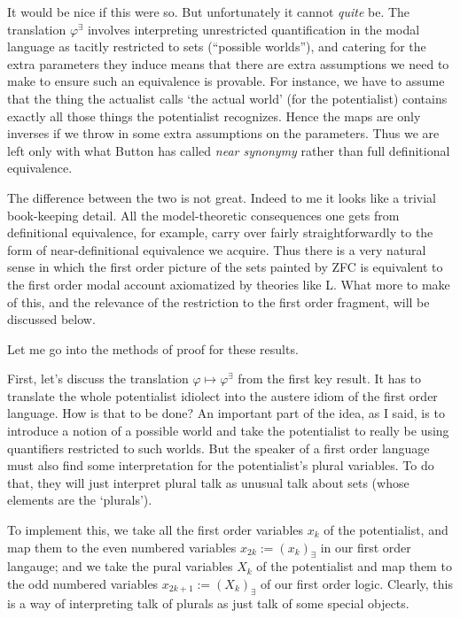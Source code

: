 \documentclass{article}
\begin{document}
It would be nice if this were so. But unfortunately it cannot \emph{quite} be. 
The translation $\varphi^\exists$ 
involves interpreting unrestricted quantification in the modal language as 
tacitly restricted 
to sets (``possible worlds''), and catering for the extra parameters they 
induce means that there
are extra assumptions we need to make to ensure such an equivalence is 
provable. For 
instance, we have to assume that the thing the actualist calls 
`the actual world' (for the potentialist)
contains exactly all those things the potentialist recognizes. 
Hence the maps 
are only inverses if we throw in some extra assumptions on the parameters.  
Thus we are 
left only with what Button has called \emph{near synonymy} 
rather than full definitional 
equivalence.

The difference between the two is not great. 
Indeed to me it looks like a trivial book-keeping detail. 
All the model-theoretic consequences one gets 
from definitional equivalence, for example, carry over fairly straightforwardly to the form of 
near-definitional equivalence we acquire. 
Thus there is a very natural sense in which the first order 
picture of the sets painted by ZFC is equivalent to the 
first order modal account axiomatized by theories like L. 
What more to make of this, and the relevance of the restriction to the 
first order fragment, will be discussed below.

Let me go into the methods of proof for these results. 

First, let's discuss the translation $\varphi \mapsto \varphi^\exists$ from the first key result.
It has to translate the whole potentialist idiolect into the austere idiom of the 
first order language. How is that to be done? An important part of the idea, as I said, is to introduce a
notion of a possible world and take the potentialist to really be using quantifiers 
restricted to such worlds. But the speaker of a first order language must also 
find some interpretation for the potentialist's plural variables. To do that, 
they will just interpret plural talk as unusual talk about sets (whose elements 
are the `plurals'). 

To implement this, we take all the 
first order variables $x_k$ of the potentialist, and 
map them to the even numbered variables $x_{2k} := (x_k)_\exists$ 
in our first order langauge; 
and we take the pural variables $X_k$ of the 
potentialist and map them to the odd numbered variables $x_{2k+1} := (X_k)_\exists$ 
of our first order logic. Clearly, this is a way of interpreting talk of 
plurals as just talk of some special objects.
\end{document}
